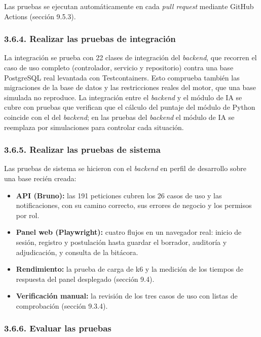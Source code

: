 Las pruebas se ejecutan automáticamente en cada \textit{pull request} mediante GitHub Actions (sección 9.5.3).

\subsubsection{3.6.4. Realizar las pruebas de integración}

La integración se prueba con 22 clases de integración del \textit{backend}, que recorren el caso de uso completo (controlador, servicio y repositorio) contra una base PostgreSQL real levantada con Testcontainers. Esto comprueba también las migraciones de la base de datos y las restricciones reales del motor, que una base simulada no reproduce. La integración entre el \textit{backend} y el módulo de IA se cubre con pruebas que verifican que el cálculo del puntaje del módulo de Python coincide con el del \textit{backend}; en las pruebas del \textit{backend} el módulo de IA se reemplaza por simulaciones para controlar cada situación.

\subsubsection{3.6.5. Realizar las pruebas de sistema}

Las pruebas de sistema se hicieron con el \textit{backend} en perfil de desarrollo sobre una base recién creada:

\begin{itemize}
    \item \textbf{API (Bruno):} las 191 peticiones cubren los 26 casos de uso y las notificaciones, con su camino correcto, sus errores de negocio y los permisos por rol.
    \item \textbf{Panel web (Playwright):} cuatro flujos en un navegador real: inicio de sesión, registro y postulación hasta guardar el borrador, auditoría y adjudicación, y consulta de la bitácora.
    \item \textbf{Rendimiento:} la prueba de carga de k6 y la medición de los tiempos de respuesta del panel desplegado (sección 9.4).
    \item \textbf{Verificación manual:} la revisión de los tres casos de uso con listas de comprobación (sección 9.3.4).
\end{itemize}

\subsubsection{3.6.6. Evaluar las pruebas}

